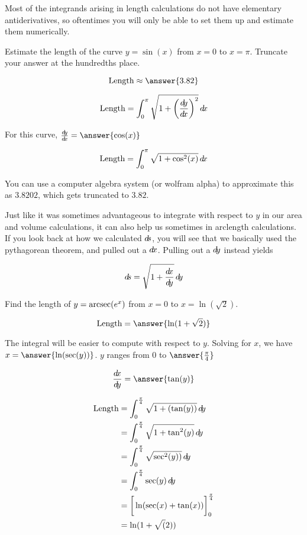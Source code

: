 \documentclass{ximera}
\begin{document}
Most of the integrands arising in length calculations do not have elementary antiderivatives, so oftentimes you will only be able to set them up and estimate them numerically.

\begin{example}
	Estimate the length of the curve $y = \sin(x)$ from $x=0$ to $x = \pi$.  Truncate your answer at the hundredths place.
		
	\[
	\textrm{Length} \approx \answer{3.82}
	\]
	
\begin{hint}
		\[
		\textrm{Length} = \int_0^\pi \sqrt{1+\left( \frac{\mathop{}\!d\! y}{ \mathop{}\!d\! x}\right)^2} \mathop{}\!d\! x
		\]
	\end{hint}
	
	\begin{hint}	
		For this curve, $\frac{\d y}{\d x} = \answer{\cos(x)}$
	\end{hint}
	
	\begin{hint}
		\[
		\textrm{Length} = \int_0^\pi \sqrt{1+\cos^2(x)} \mathop{}\!d\! x
		\]
		
		You can use a computer algebra system (or wolfram alpha) to approximate this as $3.8202$, which gets truncated to $3.82$.
	\end{hint}
\end{example}

Just like it was sometimes advantageous to integrate with respect to $y$ in our area and volume calculations, it can also help us sometimes in arclength calculations.  If you look back at how we calculated $\mathop{}\!d\! s$, you will see that we basically used the pythagorean theorem, and pulled out a $\mathop{}\!d\! x$.  Pulling out a $\mathop{}\!d\! y$ instead yields

\[
\d s = \sqrt{1+\frac{\d x}{\d y}} \d y
\]

\begin{example}
Find the length of $y = \operatorname{arcsec}(e^x)$ from $x= 0$ to $x=\ln(\sqrt{2})$.

\[
\textrm{Length} = \answer{\ln(1+\sqrt{2})}
\]

\begin{hint}
	The integral will be easier to compute with respect to $y$.  Solving for $x$, we have $x = \answer{\ln(\sec(y))}$.  $y$ ranges from $0$ to $\answer{\frac{\pi}{4}}$ 
\end{hint}

\begin{hint}
	\[
	\frac{\d x}{\d y} = \answer{\tan(y)}
	\]
\end{hint}

\begin{hint}
	\begin{align*}
		\textrm{Length} &= \int_0^{\frac{\pi}{4}} \sqrt{1+\left( \tan(y) \right)} \d y\\
			&=\int_0^{\frac{\pi}{4}} \sqrt{1+\tan^2(y)}\d y\\
			&=\int_0^{\frac{\pi}{4}} \sqrt{\sec^2(y))}\d y\\
			&=\int_0^{\frac{\pi}{4}} \sec(y) \d y\\
			&=\eval{\ln(\sec(x)+\tan(x))}_0^\frac{\pi}{4}\\
			&=\ln(1+\sqrt(2))
	\end{align*}
\end{hint}
\end{example}
\end{document}
